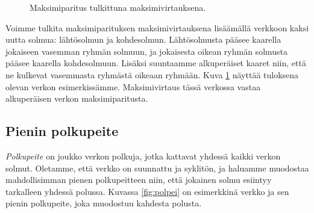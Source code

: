 \begin{figure}
\center
\begin{center}
\end{center}
\caption{Maksimiparitus tulkittuna maksimivirtauksena.}
\label{fig:parver}
\end{figure}

Voimme tulkita maksimiparituksen maksimivirtauksena
lisäämällä verkkoon kaksi uutta solmua: lähtösolmun ja kohdesolmun.
Lähtösolmusta pääsee kaarella jokaiseen vasemman ryhmän solmuun,
ja jokaisesta oikean ryhmän solmusta pääsee kaarella kohdesolmuun.
Lisäksi suuntaamme alkuperäiset kaaret niin,
että ne kulkevat vasemmasta ryhmästä oikeaan ryhmään.
Kuva \ref{fig:parver} näyttää tuloksena olevan verkon
esimerkissämme.
Maksimivirtaus tässä verkossa vastaa alkuperäisen verkon
maksimiparitusta.

\subsection{Pienin polkupeite}

\emph{Polkupeite} on joukko verkon polkuja,
jotka kattavat yhdessä kaikki verkon solmut.
Oletamme, että verkko on suunnattu ja syklitön,
ja haluamme muodostaa mahdollisimman pienen polkupeitteen
niin, että jokainen solmu esiintyy tarkalleen yhdessä polussa.
Kuvassa \ref{fig:polpei} on esimerkkinä verkko ja sen pienin polkupeite,
joka muodostuu kahdesta polusta.

